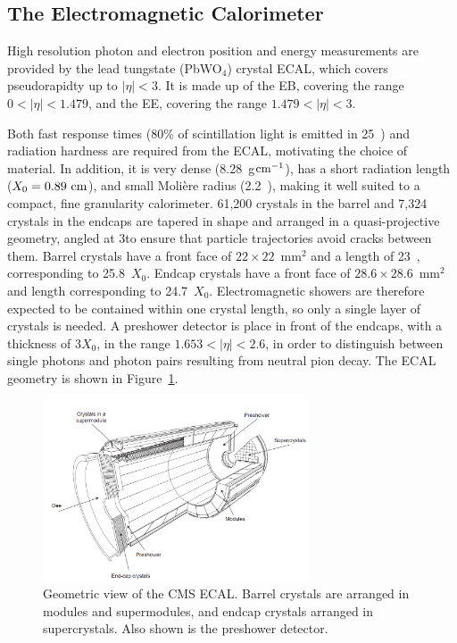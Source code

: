 

\subsection{The Electromagnetic Calorimeter}
High resolution photon and electron position and energy measurements are provided by the lead tungstate (PbWO$_{4}$) crystal \ac{ECAL}, which covers pseudorapidty up to $|\eta|<3$.
It is made up of the \ac{EB}, covering the range $0<|\eta|<1.479$,
and the \ac{EE}, covering the range $1.479<|\eta|<3$.

Both fast response times (80\% of scintillation light is emitted in 25~\ns) and radiation hardness are required from the \ac{ECAL}, motivating the choice of material.
In addition, it is very dense (8.28~g$\mathrm{cm}^{-1}$), has a short radiation length ($X_{0} = 0.89~\mathrm{cm}$), and small Moli\`{e}re radius (2.2~\cm), making it well suited to a compact, fine granularity calorimeter.
61,200 crystals in the barrel and 7,324 crystals in the endcaps are tapered in shape and arranged in a quasi-projective geometry, angled at 3\deg to ensure that particle trajectories avoid cracks between them.
Barrel crystals have a front face of $22 \times 22$~mm$^{2}$ and a length of 23~\cm, corresponding to 25.8~$X_{0}$. 
Endcap crystals have a front face of $28.6 \times 28.6$~mm$^{2}$ and length corresponding to 24.7~$X_{0}$.
Electromagnetic showers are therefore expected to be contained within one crystal length, so only a single layer of crystals is needed. 
A preshower detector is place in front of the endcaps, with a thickness of $3X_{0}$, in the range $1.653<|\eta|<2.6$, in order to distinguish between single photons and photon pairs resulting from neutral pion decay. 
The \ac{ECAL} geometry is shown in Figure~\ref{fig:CMSecal}.

\begin{figure}[htbp]
  \begin{center}
  \includegraphics[width=0.7\textwidth]{Figures/detector/cmsECAL}
  \caption{Geometric view of the \ac{CMS} \ac{ECAL}. Barrel crystals are arranged in modules and supermodules, and endcap crystals arranged in supercrystals. Also shown is the preshower detector.
}
  \label{fig:CMSecal}
  \end{center}
\end{figure}

